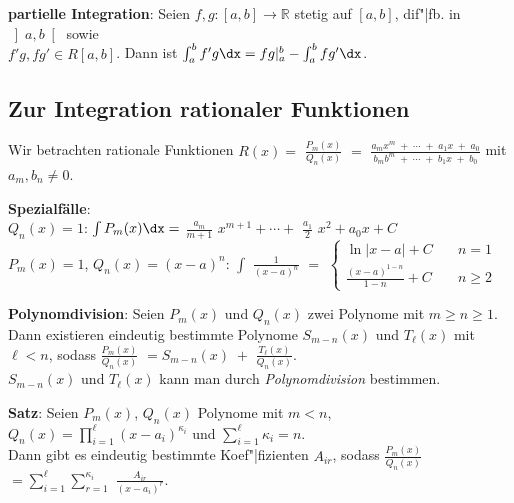 \textbf{partielle Integration}:
Seien $f, g: [a,b] \rightarrow \mathbb{R}$ stetig auf $[a,b]$,
dif"|fb. in $\left]a,b\right[$ sowie \\
$f'g, fg' \in R[a,b]$. \qquad\qquad
Dann ist $\int_a^b f'g\dx = fg|_a^b - \int_a^b fg'\dx$.

\subsection{%
    Zur Integration rationaler Funktionen%
}

Wir betrachten rationale Funktionen
$R(x) =$ {\large $\frac{P_m(x)}{Q_n(x)}$} $ = $
{\large $\frac{a_m x^m \;+\; \cdots \;+\; a_1 x \;+\; a_0}
{b_m b^m \;+\; \cdots \;+\; b_1 x \;+\; b_0}$} mit $a_m, b_n \not= 0$.

\textbf{Spezialfälle}: \\
$Q_n(x) = 1$: \qquad $\int P_m(x)\dx = $ {\large $\frac{a_m}{m + 1}$}
$x^{m+1} + \cdots + $ {\large $\frac{a_1}{2}$} $x^2 + a_0 x + C$ \\
$P_m(x) = 1$, $Q_n(x) = (x - a)^n$: \qquad
$\int$ {\large $\frac{1}{(x - a)^n}$} $ = $
{\footnotesize $\begin{cases}\ln |x - a| + C & \quad n = 1 \\
\frac{(x - a)^{1-n}}{1 - n} + C & \quad n \ge 2 \end{cases}$}

\textbf{Polynomdivision}:
Seien $P_m(x)$ und $Q_n(x)$ zwei Polynome mit $m \ge n \ge 1$.
Dann existieren eindeutig bestimmte Polynome $S_{m-n}(x)$ und
$T_\ell(x)$ mit $\ell < n$, sodass
{\large $\frac{P_m(x)}{Q_n(x)}$}
$= S_{m-n}(x) \;+$ {\large $\frac{T_\ell(x)}{Q_n(x)}$}. \\
$S_{m-n}(x)$ und $T_\ell(x)$ kann man durch \emph{Polynomdivision} bestimmen.

\textbf{Satz}:
Seien $P_m(x)$, $Q_n(x)$ Polynome mit $m < n$,
$Q_n(x) = \prod_{i=1}^\ell (x - a_i)^{\kappa_i}$ und
$\sum_{i=1}^\ell \kappa_i = n$. \\
Dann gibt es eindeutig bestimmte Koef"|fizienten $A_{ir}$, sodass
{\large $\frac{P_m(x)}{Q_n(x)}$} $= \sum_{i=1}^\ell \sum_{r=1}^{\kappa_i}$
{\large $\frac{A_{ir}}{(x - a_i)^r}$}.

\linie

